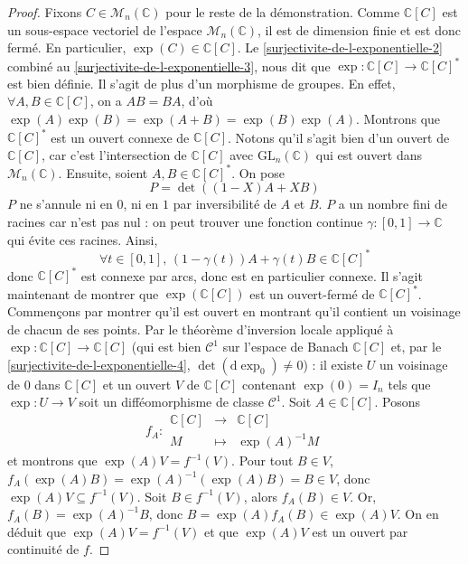   \begin{proof}
    Fixons $C \in \mathcal{M}_n(\mathbb{C})$ pour le reste de la démonstration. Comme $\mathbb{C}[C]$ est un sous-espace vectoriel de l'espace $\mathcal{M}_n(\mathbb{C})$, il est de dimension finie et est donc fermé. En particulier, $\exp(C) \in \mathbb{C}[C]$. Le \cref{surjectivite-de-l-exponentielle-2} combiné au \cref{surjectivite-de-l-exponentielle-3}, nous dit que $\exp : \mathbb{C}[C] \rightarrow \mathbb{C}[C]^*$ est bien définie. Il s'agit de plus d'un morphisme de groupes. En effet, $\forall A, B \in \mathbb{C}[C]$, on a $AB=BA$, d'où $\exp(A)\exp(B) = \exp(A+B) = \exp(B)\exp(A)$.
    \newpar
    Montrons que $\mathbb{C}[C]^*$ est un ouvert connexe de $\mathbb{C}[C]$. Notons qu'il s'agit bien d'un ouvert de $\mathbb{C}[C]$, car c'est l'intersection de $\mathbb{C}[C]$ avec $\mathrm{GL}_n(\mathbb{C})$ qui est ouvert dans $\mathcal{M}_n(\mathbb{C})$. Ensuite, soient $A, B \in \mathbb{C}[C]^*$. On pose
    \[ P = \det((1-X)A+XB) \]
    $P$ ne s'annule ni en $0$, ni en $1$ par inversibilité de $A$ et $B$. $P$ a un nombre fini de racines car n'est pas nul : on peut trouver une fonction continue $\gamma : [0,1] \rightarrow \mathbb{C}$ qui évite ces racines. Ainsi,
    \[ \forall t \in [0,1], \, (1-\gamma(t))A + \gamma(t)B \in \mathbb{C}[C]^* \]
    donc $\mathbb{C}[C]^*$ est connexe par arcs, donc est en particulier connexe.
    \newpar
    Il s'agit maintenant de montrer que $\exp(\mathbb{C}[C])$ est un ouvert-fermé de $\mathbb{C}[C]^*$. Commençons par montrer qu'il est ouvert en montrant qu'il contient un voisinage de chacun de ses points. Par le théorème d'inversion locale appliqué à $\exp : \mathbb{C}[C] \rightarrow \mathbb{C}[C]$ (qui est bien $\mathcal{C}^1$ sur l'espace de Banach $\mathbb{C}[C]$ et, par le \cref{surjectivite-de-l-exponentielle-4}, $\det(\mathrm{d}\exp_0) \neq 0$) : il existe $U$ un voisinage de $0$ dans $\mathbb{C}[C]$ et un ouvert $V$ de $\mathbb{C}[C]$ contenant $\exp(0) = I_n$ tels que $\exp : U \rightarrow V$ soit un difféomorphisme de classe $\mathcal{C}^1$. Soit $A \in \mathbb{C}[C]$. Posons
    \[
      f_A :
      \begin{array}{ccc}
        \mathbb{C}[C] &\rightarrow& \mathbb{C}[C] \\
        M &\mapsto& \exp(A)^{-1}M
      \end{array}
    \]
    et montrons que $\exp(A)V = f^{-1}(V)$.
    Pour tout $B \in V$, $f_A(\exp(A)B) = \exp(A)^{-1}(\exp(A)B) = B \in V$, donc $\exp(A)V \subseteq f^{-1}(V)$.
    \newpar
    Soit $B \in f^{-1}(V)$, alors $f_A(B) \in V$. Or, $f_A(B) = \exp(A)^{-1}B$, donc $B = \exp(A)f_A(B) \in \exp(A)V$. On en déduit que $\exp(A)V = f^{-1}(V)$ et que $\exp(A)V$ est un ouvert par continuité de $f$.

\end{proof}
